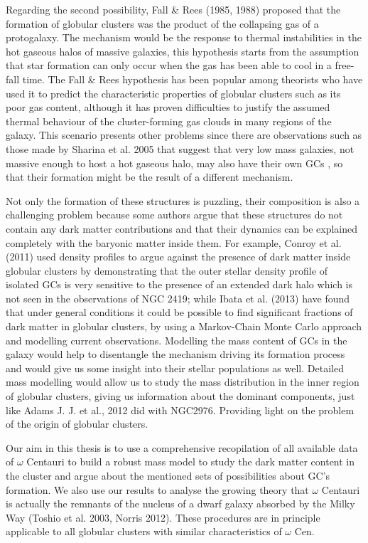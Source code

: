Regarding the second possibility, Fall \& Rees (1985, 1988) proposed that the formation of globular clusters was the product of the collapsing gas of a protogalaxy. The mechanism would be the response to thermal instabilities in the hot gaseous halos of massive galaxies, this hypothesis starts from the assumption that star formation can only occur when the gas has been able to cool in a free-fall time. The Fall \& Rees hypothesis has been popular among theorists who have used it to predict the characteristic properties of globular clusters such as its poor gas content, although it has proven difficulties to justify the assumed thermal behaviour of the cluster-forming gas clouds in many regions of the galaxy. This scenario presents other problems since there are observations such as those made by Sharina et al. 2005 that suggest that very low mass galaxies, not massive enough to host a hot gaseous halo, may also have their own GCs , so that their formation might be the result of a different mechanism.

Not only the formation of these structures is puzzling, their composition is also a challenging problem because some authors argue that these structures do not contain any dark matter contributions and that their dynamics can be explained completely with the baryonic matter inside them. For example, Conroy et al. (2011) used density profiles to argue against the presence of dark matter inside globular clusters by demonstrating that the outer stellar density profile of isolated GCs is
very sensitive to the presence of an extended dark halo which is not seen in the observations of NGC 2419; while Ibata et al. (2013) have found that under general conditions it could be possible to find significant fractions of dark matter in globular clusters, by using a Markov-Chain Monte Carlo approach and modelling current observations. Modelling the mass content of GCs in the galaxy would help to disentangle the mechanism driving its formation process and would give us some insight into their stellar populations as well. Detailed mass modelling would allow us to study the mass distribution in the inner region of globular clusters, giving us information about the dominant components, just like Adams J. J. et al., 2012 did with NGC2976. Providing light on the problem of the origin of globular clusters.

Our aim in this thesis is to use a comprehensive recopilation of all available data of $\omega$ Centauri to build a robust mass model to study the dark matter content in the cluster and argue about the mentioned sets of possibilities about GC's formation. We also use our results to analyse the growing theory that $\omega$ Centauri is actually the remnants of the nucleus of a dwarf galaxy absorbed by the Milky Way (Toshio et al. 2003, Norris 2012). These procedures are in principle applicable to all globular clusters with similar characteristics of $\omega$ Cen. 


